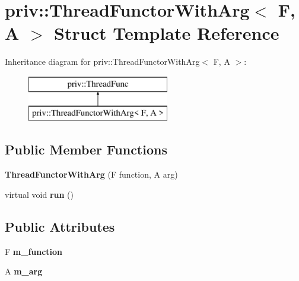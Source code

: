 \hypertarget{structpriv_1_1ThreadFunctorWithArg}{\section{priv\-:\-:Thread\-Functor\-With\-Arg$<$ F, A $>$ Struct Template Reference}
\label{structpriv_1_1ThreadFunctorWithArg}
}
Inheritance diagram for priv\-:\-:Thread\-Functor\-With\-Arg$<$ F, A $>$\-:\begin{figure}[H]
\begin{center}
\leavevmode
\includegraphics[height=2.000000cm]{structpriv_1_1ThreadFunctorWithArg}
\end{center}
\end{figure}
\subsection*{Public Member Functions}
\begin{DoxyCompactItemize}
\item 
\hypertarget{structpriv_1_1ThreadFunctorWithArg_ae3745753b77880cdfda6f10d72748efa}{{\bfseries Thread\-Functor\-With\-Arg} (F function, A arg)}\label{structpriv_1_1ThreadFunctorWithArg_ae3745753b77880cdfda6f10d72748efa}

\item 
\hypertarget{structpriv_1_1ThreadFunctorWithArg_a0f8bb6ba36819e80016528bab8b0bd4f}{virtual void {\bfseries run} ()}\label{structpriv_1_1ThreadFunctorWithArg_a0f8bb6ba36819e80016528bab8b0bd4f}

\end{DoxyCompactItemize}
\subsection*{Public Attributes}
\begin{DoxyCompactItemize}
\item 
\hypertarget{structpriv_1_1ThreadFunctorWithArg_ab12992af3112f15df4b6f0dbce3137b9}{F {\bfseries m\-\_\-function}}\label{structpriv_1_1ThreadFunctorWithArg_ab12992af3112f15df4b6f0dbce3137b9}

\item 
\hypertarget{structpriv_1_1ThreadFunctorWithArg_ac598f7701f976320bc3964733b9ae9ae}{A {\bfseries m\-\_\-arg}}\label{structpriv_1_1ThreadFunctorWithArg_ac598f7701f976320bc3964733b9ae9ae}

\end{DoxyCompactItemize}


